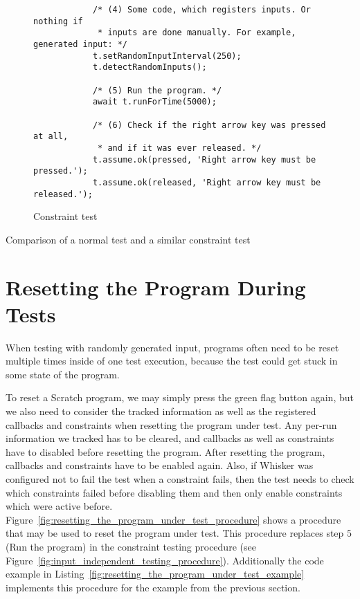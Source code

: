 \begin{listing}[htpb]
\begin{subfigure}[b]{.50\textwidth}
\begin{verbatim}
            /* (4) Some code, which registers inputs. Or nothing if
             * inputs are done manually. For example, generated input: */
            t.setRandomInputInterval(250);
            t.detectRandomInputs();

            /* (5) Run the program. */
            await t.runForTime(5000);

            /* (6) Check if the right arrow key was pressed at all,
             * and if it was ever released. */
            t.assume.ok(pressed, 'Right arrow key must be pressed.');
            t.assume.ok(released, 'Right arrow key must be released.');
        \end{verbatim}
        \vspace{-\bigskipamount}
        \caption{Constraint test}
        \label{fig:normal_input_independent_test_comparison_constraint}
    \end{subfigure}
    \caption{Comparison of a normal test and a similar constraint test}
    \label{fig:normal_input_independent_test_comparison}
\end{listing}

\section{Resetting the Program During Tests}
\label{sec:resetting_the_program_during_a_test}

When testing with randomly generated input, programs often need to be reset multiple times inside of one test execution,
because the test could get stuck in some state of the program.
\parspace

To reset a Scratch program, we may simply press the green flag button again,
but we also need to consider the tracked information as well as the registered callbacks and constraints when resetting the program under test.
Any per-run information we tracked has to be cleared, and callbacks as well as constraints have to disabled before resetting the program.
After resetting the program, callbacks and constraints have to be enabled again.
Also, if Whisker was configured not to fail the test when a constraint fails, then the test needs to check which constraints failed before disabling them
and then only enable constraints which were active before.
Figure~\ref{fig:resetting_the_program_under_test_procedure} shows a procedure that may be used to reset the program under test.
This procedure replaces step $5$ (Run the program) in the constraint testing procedure (see Figure~\ref{fig:input_independent_testing_procedure}).
Additionally the code example in Listing~\ref{fig:resetting_the_program_under_test_example}
implements this procedure for the example from the previous section.
\parspace

